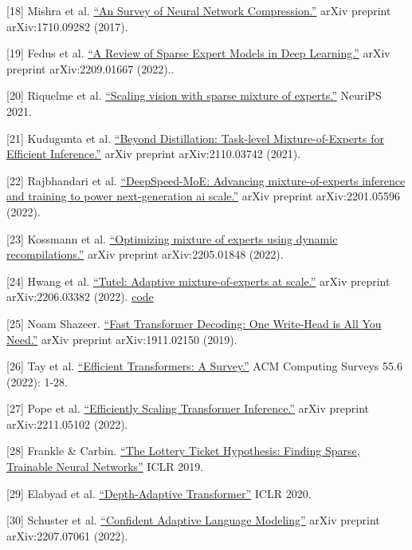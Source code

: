 {[}18{]} Mishra et al. \href{https://arxiv.org/abs/2010.03954}{``An Survey of Neural Network Compression.''} arXiv preprint arXiv:1710.09282 (2017).

{[}19{]} Fedus et al. \href{https://arxiv.org/abs/2209.01667}{``A Review of Sparse Expert Models in Deep Learning.''} arXiv preprint arXiv:2209.01667 (2022)..

{[}20{]} Riquelme et al. \href{https://arxiv.org/abs/2106.05974}{``Scaling vision with sparse mixture of experts.''} NeuriPS 2021.

{[}21{]} Kudugunta et al. \href{https://arxiv.org/abs/2110.03742}{``Beyond Distillation: Task-level Mixture-of-Experts for Efficient Inference.''} arXiv preprint arXiv:2110.03742 (2021).

{[}22{]} Rajbhandari et al. \href{https://arxiv.org/abs/2201.05596}{``DeepSpeed-MoE: Advancing mixture-of-experts inference and training to power next-generation ai scale.''} arXiv preprint arXiv:2201.05596 (2022).

{[}23{]} Kossmann et al. \href{https://arxiv.org/abs/2205.01848}{``Optimizing mixture of experts using dynamic recompilations.''} arXiv preprint arXiv:2205.01848 (2022).

{[}24{]} Hwang et al. \href{https://arxiv.org/abs/2206.03382}{``Tutel: Adaptive mixture-of-experts at scale.''} arXiv preprint arXiv:2206.03382 (2022). \textbar{} \href{https://github.com/microsoft/tutel}{code}

{[}25{]} Noam Shazeer. \href{https://arxiv.org/abs/1911.02150}{``Fast Transformer Decoding: One Write-Head is All You Need.''} arXiv preprint arXiv:1911.02150 (2019).

{[}26{]} Tay et al. \href{https://arxiv.org/abs/2009.06732}{``Efficient Transformers: A Survey.''} ACM Computing Surveys 55.6 (2022): 1-28.

{[}27{]} Pope et al. \href{https://arxiv.org/abs/2211.05102}{``Efficiently Scaling Transformer Inference.''} arXiv preprint arXiv:2211.05102 (2022).

{[}28{]} Frankle \& Carbin. \href{https://arxiv.org/abs/1803.03635}{``The Lottery Ticket Hypothesis: Finding Sparse, Trainable Neural Networks''} ICLR 2019.

{[}29{]} Elabyad et al. \href{https://arxiv.org/abs/1910.10073}{``Depth-Adaptive Transformer''} ICLR 2020.

{[}30{]} Schuster et al. \href{https://arxiv.org/abs/2207.07061}{``Confident Adaptive Language Modeling''} arXiv preprint arXiv:2207.07061 (2022).

